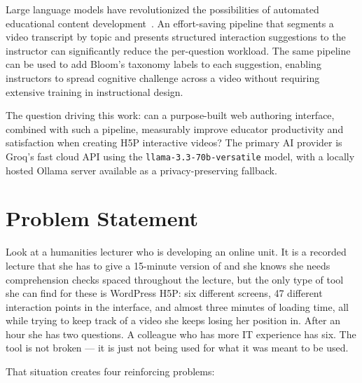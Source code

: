 Large language models have revolutionized the possibilities of automated educational content development~\cite{brown2020,anthropic2024}. An effort-saving pipeline that segments a video transcript by topic and presents structured interaction suggestions to the instructor can significantly reduce the per-question workload. The same pipeline can be used to add Bloom's taxonomy labels to each suggestion, enabling instructors to spread cognitive challenge across a video without requiring extensive training in instructional design.

The question driving this work: can a purpose-built web authoring interface, combined with such a pipeline, measurably improve educator productivity and satisfaction when creating H5P interactive videos? The primary AI provider is Groq's fast cloud API using the \texttt{llama-3.3-70b-versatile} model, with a locally hosted Ollama server available as a privacy-preserving fallback.

\section{Problem Statement}

Look at a humanities lecturer who is developing an online unit. It is a recorded lecture that she has to give a 15-minute version of and she knows she needs comprehension checks spaced throughout the lecture, but the only type of tool she can find for these is WordPress H5P: six different screens, 47 different interaction points in the interface, and almost three minutes of loading time, all while trying to keep track of a video she keeps losing her position in. After an hour she has two questions. A colleague who has more IT experience has six. The tool is not broken --- it is just not being used for what it was meant to be used.

That situation creates four reinforcing problems:

